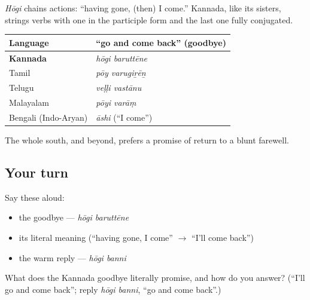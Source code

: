\begin{grammarlens}[title={Grammar Lens: the \textquotedblleft{}having …d\textquotedblright{} participle}]
\emph{Hōgi} chains actions: \textquotedblleft{}having gone, (then) I come.\textquotedblright{} Kannada, like its sisters, strings verbs with one in the participle form and the last one fully conjugated.
\end{grammarlens}

\begin{tcolorbox}[breakable,skin=enhanced,colback=violet!6,colframe=violet!45!black,boxrule=0.5pt,arc=1mm,left=6pt,right=6pt,top=4pt,bottom=4pt,fonttitle=\bfseries,title={Across the family — the same idea, five ways}]
\noindent
\begin{tabularx}{\linewidth}{@{}>{\raggedright\arraybackslash}X>{\raggedright\arraybackslash}X@{}}
\toprule
\textbf{Language} & \textbf{\textquotedblleft{}go and come back\textquotedblright{} (goodbye)} \\
\midrule
\textbf{Kannada} & \emph{hōgi baruttēne} \\
Tamil & \emph{pōy varugiṟēṉ} \\
Telugu & \emph{veḷḷi vastānu} \\
Malayalam & \emph{pōyi varāṃ} \\
Bengali (Indo-Aryan) & \emph{āshi} (\textquotedblleft{}I come\textquotedblright{}) \\
\bottomrule
\end{tabularx}

The whole south, and beyond, prefers a promise of return to a blunt farewell.
\end{tcolorbox}

\subsection*{Your turn}
Say these aloud:

\begin{itemize}
\raggedright
  \item the goodbye — \emph{hōgi baruttēne}
  \item its literal meaning (\textquotedblleft{}having gone, I come\textquotedblright{} $\to$ \textquotedblleft{}I'll come back\textquotedblright{})
  \item the warm reply — \emph{hōgi banni}
\end{itemize}

\begin{tcolorbox}[breakable,colback=teal!4,colframe=teal!35!black,title={Before you move on}]
What does the Kannada goodbye literally promise, and how do you answer? (\textquotedblleft{}I'll go and come back\textquotedblright{}; reply \emph{hōgi banni}, \textquotedblleft{}go and come back\textquotedblright{}.)
\end{tcolorbox}
